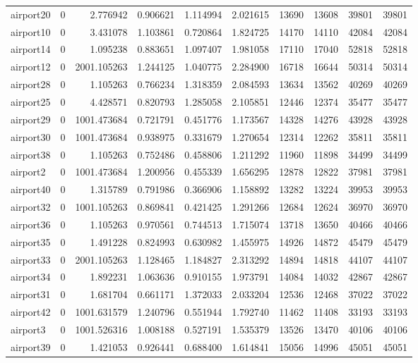 \begin{longtable}{|l|r|r|r|r|r|r|r|r|r|}
airport20 & 0 & 2.776942 & 0.906621 & 1.114994 & 2.021615 & 13690 & 13608 & 39801 & 39801 \\
airport10 & 0 & 3.431078 & 1.103861 & 0.720864 & 1.824725 & 14170 & 14110 & 42084 & 42084 \\
airport14 & 0 & 1.095238 & 0.883651 & 1.097407 & 1.981058 & 17110 & 17040 & 52818 & 52818 \\
airport12 & 0 & 2001.105263 & 1.244125 & 1.040775 & 2.284900 & 16718 & 16644 & 50314 & 50314 \\
airport28 & 0 & 1.105263 & 0.766234 & 1.318359 & 2.084593 & 13634 & 13562 & 40269 & 40269 \\
airport25 & 0 & 4.428571 & 0.820793 & 1.285058 & 2.105851 & 12446 & 12374 & 35477 & 35477 \\
airport29 & 0 & 1001.473684 & 0.721791 & 0.451776 & 1.173567 & 14328 & 14276 & 43928 & 43928 \\
airport30 & 0 & 1001.473684 & 0.938975 & 0.331679 & 1.270654 & 12314 & 12262 & 35811 & 35811 \\
airport38 & 0 & 1.105263 & 0.752486 & 0.458806 & 1.211292 & 11960 & 11898 & 34499 & 34499 \\
airport2 & 0 & 1001.473684 & 1.200956 & 0.455339 & 1.656295 & 12878 & 12822 & 37981 & 37981 \\
airport40 & 0 & 1.315789 & 0.791986 & 0.366906 & 1.158892 & 13282 & 13224 & 39953 & 39953 \\
airport32 & 0 & 1001.105263 & 0.869841 & 0.421425 & 1.291266 & 12684 & 12624 & 36970 & 36970 \\
airport36 & 0 & 1.105263 & 0.970561 & 0.744513 & 1.715074 & 13718 & 13650 & 40466 & 40466 \\
airport35 & 0 & 1.491228 & 0.824993 & 0.630982 & 1.455975 & 14926 & 14872 & 45479 & 45479 \\
airport33 & 0 & 2001.105263 & 1.128465 & 1.184827 & 2.313292 & 14894 & 14818 & 44107 & 44107 \\
airport34 & 0 & 1.892231 & 1.063636 & 0.910155 & 1.973791 & 14084 & 14032 & 42867 & 42867 \\
airport31 & 0 & 1.681704 & 0.661171 & 1.372033 & 2.033204 & 12536 & 12468 & 37022 & 37022 \\
airport42 & 0 & 1001.631579 & 1.240796 & 0.551944 & 1.792740 & 11462 & 11408 & 33193 & 33193 \\
airport3 & 0 & 1001.526316 & 1.008188 & 0.527191 & 1.535379 & 13526 & 13470 & 40106 & 40106 \\
airport39 & 0 & 1.421053 & 0.926441 & 0.688400 & 1.614841 & 15056 & 14996 & 45051 & 45051 \\

\end{longtable}
